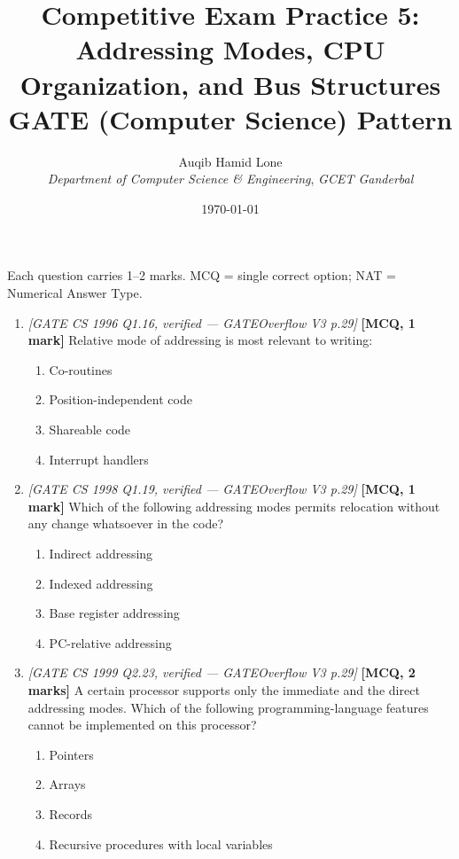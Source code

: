 \documentclass[11pt]{article}
\title{Competitive Exam Practice 5: Addressing Modes, CPU Organization, and Bus Structures\\\large GATE (Computer Science) Pattern}
\author{Auqib Hamid Lone\\[0.3em]
  \emph{Department of Computer Science \& Engineering}, \emph{GCET Ganderbal}}
\date{\today}
\begin{document}
\maketitle

\noindent Each question carries 1--2 marks. MCQ = single correct option; NAT = Numerical Answer Type.

\begin{enumerate}
\item[\textbf{Q1}] \textit{[GATE CS 1996 Q1.16, verified --- GATEOverflow V3 p.29]} \textbf{[MCQ, 1 mark]} Relative mode of addressing is most relevant to writing:
\begin{enumerate}
  \item[(A)] Co-routines
  \item[(B)] Position-independent code
  \item[(C)] Shareable code
  \item[(D)] Interrupt handlers
\end{enumerate}

\item[\textbf{Q2}] \textit{[GATE CS 1998 Q1.19, verified --- GATEOverflow V3 p.29]} \textbf{[MCQ, 1 mark]} Which of the following addressing modes permits relocation without any change whatsoever in the code?
\begin{enumerate}
  \item[(A)] Indirect addressing
  \item[(B)] Indexed addressing
  \item[(C)] Base register addressing
  \item[(D)] PC-relative addressing
\end{enumerate}

\item[\textbf{Q3}] \textit{[GATE CS 1999 Q2.23, verified --- GATEOverflow V3 p.29]} \textbf{[MCQ, 2 marks]} A certain processor supports only the immediate and the direct addressing modes. Which of the following programming-language features cannot be implemented on this processor?
\begin{enumerate}
  \item[(A)] Pointers
  \item[(B)] Arrays
  \item[(C)] Records
  \item[(D)] Recursive procedures with local variables
\end{enumerate}


\end{enumerate}
\end{document}
